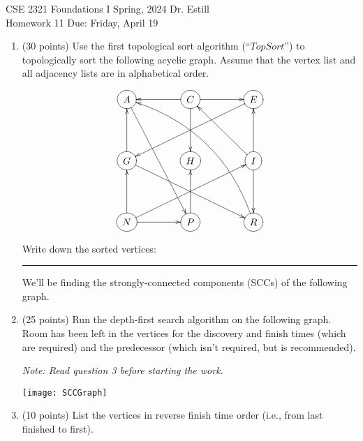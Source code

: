\documentclass[12 pt]{amsart}
\begin{document}
\begin{center} \Large
	CSE 2321 \quad Foundations I \quad Spring, 2024 \quad Dr. Estill \\ \large
	Homework 11 \quad Due: Friday, April 19
\end{center}

\vspace{3ex}


\begin{enumerate}[label=\arabic*.)]
	
	\item (30 points) Use the first topological sort algorithm (``$TopSort$'') to topologically sort the following acyclic graph.
	Assume that the vertex list and all adjacency lists are in alphabetical order.
	
	\[\xymatrix@+20pt{
		*++[o][F]{A} \ar[ddr] 				& *++[o][F]{C} \ar[r] \ar[d] \ar[l]	 	& *++[o][F]{E} \ar[dll] \\
		*++[o][F]{G} \ar[drr] \ar[u]			& *++[o][F]{H} 					& *++[o][F]{I} \ar[ul] \ar[u] \ar[d] \\
		*++[o][F]{N} \ar[urr] \ar[u] \ar[r]		& *++[o][F]{P} \ar[u]				& *++[o][F]{R} \ar@/_2pc/[uull]
	}\]
	
	\vspace{1.5cm}
	
	Write down the sorted vertices: \rule{3 in}{0.1pt}
	
	\newpage
	
	\noindent We'll be finding the strongly-connected components (SCCs) of the following graph.
	
	\vspace{1cm}
	
	\item (25 points) Run the depth-first search algorithm on the following graph.
	Room has been left in the vertices for the discovery and finish times (which are required) and the predecessor (which isn't required, but is recommended).
	
	\noindent\emph{Note: Read question 3 before starting the work.}
	
	\smallskip
	
	\begin{center}
		\texttt{[image: SCCGraph]}
	\end{center}
	
	\bigskip
	
	\item (10 points) List the vertices in reverse finish time order (i.e., from last finished to first).
	

\end{enumerate}
\end{document}
